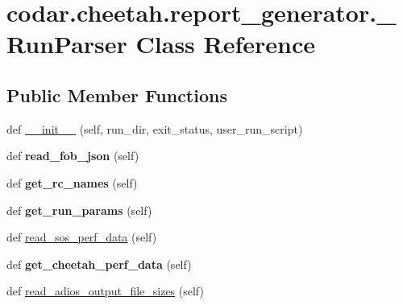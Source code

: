 \hypertarget{classcodar_1_1cheetah_1_1report__generator_1_1___run_parser}{}\section{codar.\+cheetah.\+report\+\_\+generator.\+\_\+\+Run\+Parser Class Reference}
\label{classcodar_1_1cheetah_1_1report__generator_1_1___run_parser}
\subsection*{Public Member Functions}
\begin{DoxyCompactItemize}
\item 
def \hyperlink{classcodar_1_1cheetah_1_1report__generator_1_1___run_parser_a085ef8ca09a1649d547a5213930091fb}{\+\_\+\+\_\+init\+\_\+\+\_\+} (self, run\+\_\+dir, exit\+\_\+status, user\+\_\+run\+\_\+script)
\item 
\mbox{\label{classcodar_1_1cheetah_1_1report__generator_1_1___run_parser_a1344ae721004fca069d90951b9955313}} 
def {\bfseries read\+\_\+fob\+\_\+json} (self)
\item 
\mbox{\label{classcodar_1_1cheetah_1_1report__generator_1_1___run_parser_acfaf599f36190b82bf22f00928afd39a}} 
def {\bfseries get\+\_\+rc\+\_\+names} (self)
\item 
\mbox{\label{classcodar_1_1cheetah_1_1report__generator_1_1___run_parser_ac261f1918d9f061a651cd0b15a6ef063}} 
def {\bfseries get\+\_\+run\+\_\+params} (self)
\item 
def \hyperlink{classcodar_1_1cheetah_1_1report__generator_1_1___run_parser_a56d3a88ac8e6190bb01a590097a0bb9c}{read\+\_\+sos\+\_\+perf\+\_\+data} (self)
\item 
\mbox{\label{classcodar_1_1cheetah_1_1report__generator_1_1___run_parser_a44db172a7eb7bb6d42fd6eb97fa3862f}} 
def {\bfseries get\+\_\+cheetah\+\_\+perf\+\_\+data} (self)
\item 
def \hyperlink{classcodar_1_1cheetah_1_1report__generator_1_1___run_parser_a646e539d01988c82c677f7056e6942a2}{read\+\_\+adios\+\_\+output\+\_\+file\+\_\+sizes} (self)

\end{DoxyCompactItemize}
